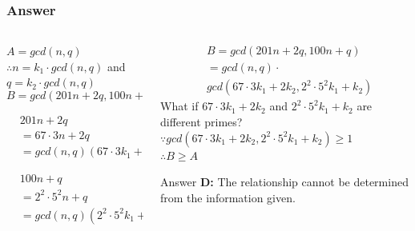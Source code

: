 \documentclass[
	11pt, %
]{beamer}
\begin{document}
\begin{frame}
	\frametitle{Answer}



  	\begin{columns}[t] %
		\begin{column}{0.5\textwidth} %
			$A = gcd(n, q)$ \\
	$\therefore n = k_1 \cdot gcd(n, q)$ and $q = k_2 \cdot gcd(n, q)$\\
	\bigskip
	\begin{equation*}
		B = gcd(201n + 2q, 100n + q) 
	\end{equation*}
  
				
				\begin{equation*}
				  	\begin{aligned}
				  	&201n + 2q \\&= 67 \cdot 3 n + 2q \\&= gcd(n, q) ( 67 \cdot 3 k_1 + 2k_2)
				  	\end{aligned}
				  \end{equation*}

				  					\begin{equation*}
			  	\begin{aligned}
			  	&100n + q \\&= 2^2\cdot5^2n + q \\&= gcd(n, q) ( 2^2\cdot5^2k_1 + k_2)
			  	\end{aligned}
			  \end{equation*}

		\end{column}
		\begin{column}{0.5\textwidth} %
\begin{equation*}
			  	\begin{aligned}
			  	&B = gcd(201n + 2q, 100n + q)\\&=gcd(n,q) \cdot \\ &gcd(67 \cdot 3 k_1 + 2k_2, 2^2\cdot5^2k_1 + k_2)
			  	\end{aligned}
			  \end{equation*}
\pause				
\alert{What if $67 \cdot 3 k_1 + 2k_2$ and $2^2\cdot5^2k_1 + k_2$ are different primes?}\\

	$\because gcd(67 \cdot 3 k_1 + 2k_2, 2^2\cdot5^2k_1 + k_2) \geq 1$  \\ 
	$\therefore  B \geq A $ \\
		\bigskip

\pause
Answer \textbf{D: } The relationship cannot be determined from the information given.
		\end{column}
	\end{columns}
  
	



\end{frame}
\end{document}
